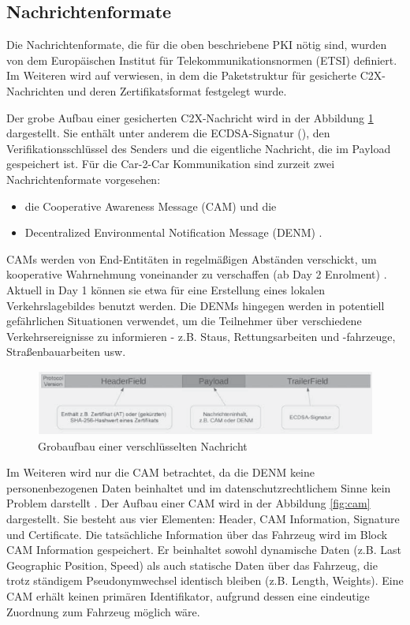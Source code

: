 \subsection{Nachrichtenformate}
\label{sec:FirstContentSection:SecondSubSection}

Die Nachrichtenformate, die für die oben beschriebene PKI nötig sind, wurden von dem Europäischen Institut für Telekommunikationsnormen (ETSI) definiert. Im Weiteren wird auf \cite{ETSI2018} verwiesen, in dem die Paketstruktur für gesicherte C2X-Nachrichten und deren Zertifikatsformat festgelegt wurde. 

Der grobe Aufbau einer gesicherten C2X-Nachricht wird in der Abbildung \ref{fig:nachrichtenaufbau} dargestellt. Sie enthält unter anderem die ECDSA-Signatur (\cite{Barker2013}), den Verifikationsschlüssel des Senders und die eigentliche Nachricht, die im Payload gespeichert ist. Für die Car-2-Car Kommunikation sind zurzeit zwei Nachrichtenformate vorgesehen:
\begin{itemize}
	\item die Cooperative Awareness Message (CAM) und die 
	\item Decentralized Environmental Notification Message (DENM) \cite{ETSI2013}.
\end{itemize}
CAMs werden von End-Entitäten in regelmäßigen Abständen verschickt, um kooperative Wahrnehmung voneinander zu verschaffen (ab Day 2 Enrolment) . Aktuell in Day 1 können sie etwa für eine Erstellung eines lokalen Verkehrslagebildes benutzt werden. Die DENMs hingegen werden in potentiell gefährlichen Situationen verwendet, um die Teilnehmer über verschiedene Verkehrsereignisse zu informieren - z.B. Staus, Rettungsarbeiten und -fahrzeuge, Straßenbauarbeiten usw. 

\begin{figure}
	\centering
	\includegraphics[width=0.7\linewidth]{images/Nachrichtenaufbau}
	\caption[Grobaufbau einer verschlüsselten Nachricht]{Grobaufbau einer verschlüsselten Nachricht \footnotemark}
	\label{fig:nachrichtenaufbau}
\end{figure}

Im Weiteren wird nur die CAM betrachtet, da die DENM keine personenbezogenen Daten beinhaltet und im datenschutzrechtlichem Sinne kein Problem darstellt \cite{Kiometzis2017}. Der Aufbau einer CAM wird in der Abbildung \ref{fig:cam} dargestellt. Sie besteht aus vier Elementen: Header, CAM Information, Signature und Certificate. Die tatsächliche Information über das Fahrzeug wird im Block CAM Information gespeichert. Er beinhaltet sowohl dynamische Daten (z.B. Last Geographic Position, Speed) als auch statische Daten über das Fahrzeug, die trotz ständigem Pseudonymwechsel identisch bleiben (z.B. Length, Weights). Eine CAM erhält keinen primären Identifikator, aufgrund dessen eine eindeutige Zuordnung zum Fahrzeug möglich wäre.

